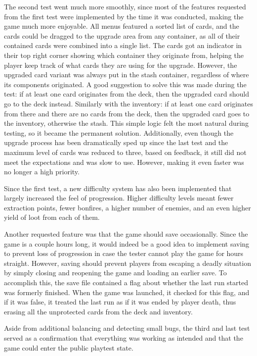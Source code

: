 The second test went much more smoothly, since most of the features requested from the first test were implemented by the time it was conducted, making the game much more enjoyable. All menus featured a sorted list of cards, and the cards could be dragged to the upgrade area from any container, as all of their contained cards were combined into a single list. The cards got an indicator in their top right corner showing which container they originate from, helping the player keep track of what cards they are using for the upgrade. However, the upgraded card variant was always put in the stash container, regardless of where its components originated. A good suggestion to solve this was made during the test: if at least one card originates from the deck, then the upgraded card should go to the deck instead. Similarly with the inventory: if at least one card originates from there and there are no cards from the deck, then the upgraded card goes to the inventory, otherwise the stash. This simple logic felt the most natural during testing, so it became the permanent solution. Additionally, even though the upgrade process has been dramatically sped up since the last test and the maximum level of cards was reduced to three, based on feedback, it still did not meet the expectations and was slow to use. However, making it even faster was no longer a high priority.

Since the first test, a new difficulty system has also been implemented that largely increased the feel of progression. Higher difficulty levels meant fewer extraction points, fewer bonfires, a higher number of enemies, and an even higher yield of loot from each of them.

Another requested feature was that the game should save occasionally. Since the game is a couple hours long, it would indeed be a good idea to implement saving to prevent loss of progression in case the tester cannot play the game for hours straight. However, saving should prevent players from escaping a deadly situation by simply closing and reopening the game and loading an earlier save. To accomplish this, the save file contained a flag about whether the last run started was formerly finished. When the game was launched, it checked for this flag, and if it was false, it treated the last run as if it was ended by player death, thus erasing all the unprotected cards from the deck and inventory.

Aside from additional balancing and detecting small bugs, the third and last test served as a confirmation that everything was working as intended and that the game could enter the public playtest state. 

